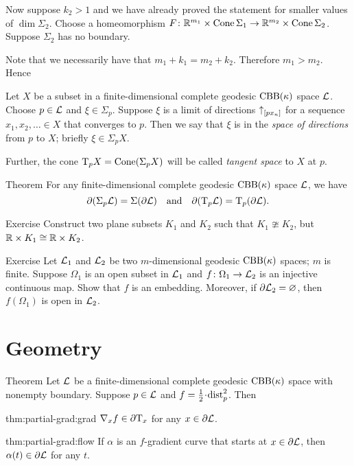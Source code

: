 Now suppose $k_2 > 1$ and we have already proved the statement for smaller values of $\dim \Sigma_2$.
Choose a homeomorphism $F\colon\mathbb{R}^{m_1}\times \mathop{\rm Cone}\nolimits\Sigma_1\to\mathbb{R}^{m_2}\times \mathop{\rm Cone}\nolimits\Sigma_2$.
Suppose $\Sigma_2$ has no boundary.

Note that we necessarily have that $m_1 + k_1 = m_2 + k_2$.
Therefore $m_1>m_2$.
Hence 
\qeds


\qeds


Let $X$ be a subset in a finite-dimensional complete geodesic $\mathrm{CBB}(\kappa)$ space $\mathcal{L}$.
Choose $p\in \mathcal{L}$ and $\xi\in \Sigma_p$.
Suppose $\xi$ is a limit of directions ${\uparrow}_{[{p}{x_n}]}$ for a sequence $x_1,x_2,\dots{}\in X$ that converges to $p$.
Then we say that $\xi$ is in the \emph{space of directions} from $p$ to $X$; briefly $\xi\in\Sigma_pX$.

Further, the cone $\mathrm{T}_pX=\mathop{\rm Cone}\nolimits(\Sigma_pX)$ will be called \emph{tangent space} to $X$ at $p$.

\begin{thm}{Theorem}\label{thm:partial-Sigma}
For any finite-dimensional complete geodesic $\mathrm{CBB}(\kappa)$ space $\mathcal{L}$, we have
\[\partial (\Sigma_p\mathcal{L})=\Sigma(\partial\mathcal{L})
\quad\text{and}\quad
\partial(\mathrm{T}_p\mathcal{L})=\mathrm{T}_p(\partial\mathcal{L}).\]
\end{thm}

\begin{thm}{Exercise}
Construct two plane subsets $K_1$ and $K_2$ such that $K_1\ncong K_2$,
but $\mathbb{R}\times K_1\cong \mathbb{R}\times K_2$.
\end{thm}

\begin{thm}{Exercise}
Let $\mathcal{L}_1$ and $\mathcal{L}_2$ be two $m$-dimensional geodesic $\mathrm{CBB}(\kappa)$ spaces; $m$ is finite.
Suppose $\Omega_1$ is an open subset in $\mathcal{L}_1$ and $f\colon\Omega_1\to \mathcal{L}_2$ is an injective continuous map.
Show that $f$ is an embedding.
Moreover, if $\partial\mathcal{L}_2=\varnothing$, then $f(\Omega_1)$ is open in $\mathcal{L}_2$.  
\end{thm}



\section{Geometry}

\begin{thm}{Theorem}\label{thm:partial-grad}
Let $\mathcal{L}$ be a finite-dimensional complete geodesic $\mathrm{CBB}(\kappa)$ space with nonempty boundary.
Suppose $p\in \mathcal{L}$ and $f\z=\tfrac12\cdot\distfun_p^2$.
Then

\begin{subthm}{thm:partial-grad:grad}
$\nabla_xf\in \partial\mathrm{T}_x$ for any $x\in\partial \mathcal{L}$.
\end{subthm}

\begin{subthm}{thm:partial-grad:flow}
If $\alpha$ is an $f$-gradient curve that starts at $x\in \partial \mathcal{L}$, then $\alpha(t)\in \partial \mathcal{L}$ for any $t$.
\end{subthm}

\end{thm}

